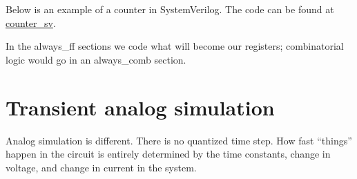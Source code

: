 Below is an example of a counter in SystemVerilog. The code can be found
at
\href{https://github.com/wulffern/dicex/tree/main/sim/verilog/counter_sv}{counter\_sv}.

In the always\_ff sections we code what will become our registers;
combinatorial logic would go in an always\_comb section.

\begin{Shaded}
\begin{Highlighting}[]
\OperatorTok{(}
            \OperatorTok{,}
            \OperatorTok{,}
           \OperatorTok{[}\OperatorTok{:}\OperatorTok{]}
           \OperatorTok{);}

\OperatorTok{=} \OperatorTok{;}

\OperatorTok{)} 
      \OperatorTok{(}\OperatorTok{)}
\OperatorTok{\textless{}=} \OperatorTok{;}
\OperatorTok{\textless{}=} \OperatorTok{;}

\OperatorTok{)} 
      \OperatorTok{(}\OperatorTok{)}
\OperatorTok{\textless{}=} \OperatorTok{;}
\OperatorTok{\textless{}=}\OperatorTok{+} \OperatorTok{;}
    

\end{Highlighting}
\end{Shaded}

\section{Transient analog simulation}\label{transient-analog-simulation}

Analog simulation is different. There is no quantized time step. How
fast ``things'' happen in the circuit is entirely determined by the time
constants, change in voltage, and change in current in the system.

